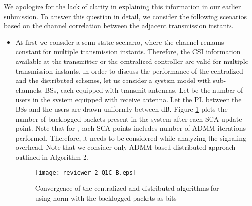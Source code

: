\begin{enumerate}
\resp We apologize for the lack of clarity in explaining this information in our earlier submission. To answer this question in detail, we consider the following scenarios based on the channel correlation between the adjacent transmission instants. 

\begin{itemize}
\item At first we consider a semi-static scenario, where the channel remains constant for multiple transmission instants. Therefore, the \ac{CSI} information available at the transmitter or the centralized controller are valid for multiple transmission instants. In order to discuss the performance of the centralized and the distributed schemes, let us consider a system model with  sub-channels,  \acp{BS}, each equipped with  transmit antennas. Let  be the number of users in the system equipped with  receive antenna. Let the \ac{PL} between the \acp{BS} and the users are drawn uniformly between \eqn{[0,-3]} dB. Figure \ref{fig-review-2-a} plots the number of backlogged packets present in the system after each \ac{SCA} update point. Note that for , each \ac{SCA} points includes  number of \ac{ADMM} iterations performed. Therefore, it needs to be considered while analyzing the signaling overhead. Note that we consider only \ac{ADMM} based distributed approach outlined in Algorithm 2.
\begin{figure}[h!]
\centering
\texttt{[image: reviewer\_2\_Q1C-B.eps]}
\caption{Convergence of the centralized and distributed algorithms for  using  norm with the backlogged packets as  bits}
\label{fig-review-2-a}
\end{figure}


\end{itemize}
\end{enumerate}
